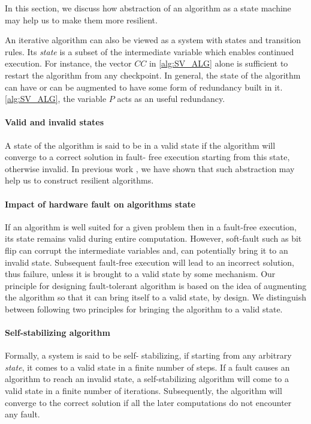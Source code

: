 
In this section, we discuss how abstraction of an algorithm as a state machine
may help us to make them more resilient.

An iterative algorithm can also be viewed as a system with states and
transition rules. Its \emph{state} is a subset of the intermediate variable
which enables continued execution. For instance, the vector $CC$ in
\cref{alg:SV_ALG} alone is sufficient to restart the algorithm from any
checkpoint. In general, the state of the algorithm can have or can be
augmented to have some form of  redundancy built in it.   %
\cref{alg:SV_ALG}, the variable $P$  acts as an useful redundancy.
\paragraph{Valid and invalid states} A state of the algorithm is said to be in
a valid state if the algorithm will converge to a correct solution in fault-
free execution starting from this state, otherwise invalid. In previous work
, we have shown that such abstraction may help us to construct
resilient algorithms.



\paragraph{Impact of hardware fault on algorithms state}

If an algorithm is well suited for a given problem then in a fault-free
execution, its state remains valid during entire computation. However,
soft-fault such as bit flip can corrupt the intermediate variables
and, can potentially bring it to an invalid state. Subsequent fault-free
execution will lead to an incorrect solution, thus failure, unless
it is brought to a valid state by some mechanism. Our principle for
designing fault-tolerant algorithm is based on the idea of augmenting
the algorithm so that it can bring itself to a valid state, by design.
We distinguish between following two principles for bringing the algorithm
to a valid state.

\paragraph{Self-stabilizing algorithm} Formally, a system is said to be self-
stabilizing, if starting from any arbitrary \emph{state}, it comes to a valid
state in a finite number of steps\cite{dijkstra1982self}. If a fault causes an
algorithm to reach an invalid state, a self-stabilizing algorithm will come to
a valid state in a finite number of iterations. Subsequently, the algorithm
will converge to the correct solution if all the later computations do not
encounter any fault.

